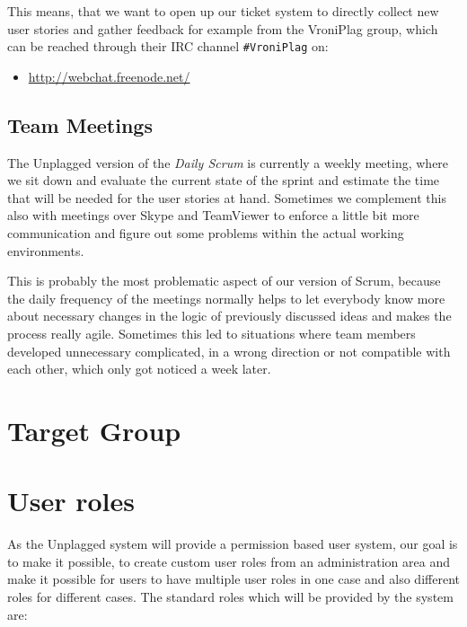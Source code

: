 This means, that we want to open up our ticket system to directly collect new user stories and gather feedback for 
example from the VroniPlag group, which can be reached through their IRC channel \texttt{\#VroniPlag} on:

\begin{itemize}
\item \url{http://webchat.freenode.net/}
\end{itemize} 


\subsection{Team Meetings}

The Unplagged version of the \textit{Daily Scrum} is currently a weekly meeting, where we sit down
and evaluate the current state of the sprint and estimate the time that will be needed for the user stories at hand.
Sometimes we complement this also with meetings over Skype and TeamViewer to enforce a little bit more communication and 
figure out some problems within the actual working environments.

This is probably the most problematic aspect of our version of Scrum, because the daily frequency of the meetings normally 
helps to let everybody know more about necessary changes in the logic of previously discussed ideas and makes the process
really agile. Sometimes this led to situations where team members developed unnecessary complicated, in a wrong direction
or not compatible with each other, which only got noticed a week later.



\section{Target Group}

\section{User roles}
As the Unplagged system will provide a permission based user system, our goal is to make it possible, to create custom user roles from an administration area and make it possible for users to have multiple user roles in one case and also different roles for different cases.
The standard roles which will be provided by the system are:

